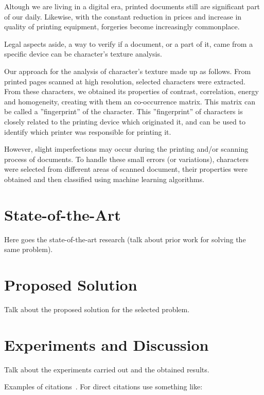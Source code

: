 \documentclass[10pt,twocolumn,letterpaper]{article}
\begin{document}
Altough we are living in a digital era, printed documents still are significant part of our daily. Likewise, with the constant reduction in prices and increase in quality of printing equipment, forgeries become increasingly commonplace.

Legal aspects aside, a way to verify if a document, or a part of it, came from a specific device can be character's texture analysis.

Our approach for the analysis of character's texture made up as follows. From printed pages scanned at high resolution, selected characters were extracted. From these characters, we obtained its properties of contrast, correlation, energy and homogeneity, creating with them an co-occurrence matrix. This matrix can be called a ''fingerprint'' of the character. This ''fingerprint'' of  characters is closely related to the printing device which originated it, and can be used to identify which printer was responsible for printing it.

However, slight imperfections may occur during the printing and/or scanning process of documents. To handle these small errors (or variations), characters were selected from different areas of scanned document, their properties were obtained and then classified using machine learning algorithms.


\section{State-of-the-Art}
Here goes the state-of-the-art research (talk about prior work for solving the same problem). 

\section{Proposed Solution}
Talk about the proposed solution for the selected problem. 

\section{Experiments and Discussion}
Talk about the experiments carried out and the obtained results. 

Examples of citations~\cite{Ni_2008, Ni_2009}. For direct citations use something like: 
\end{document}
